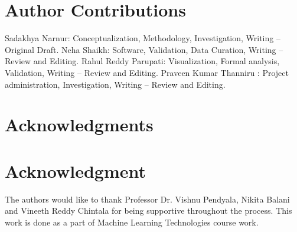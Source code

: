 \documentclass[10pt,journal,compsoc]{IEEEtran}
\begin{document}
\section{Author Contributions}
Sadakhya Narnur: Conceptualization, Methodology, Investigation, Writing – Original Draft.
Neha Shaikh: Software, Validation, Data Curation, Writing – Review and Editing.
Rahul Reddy Parupati: Visualization, Formal analysis, Validation, Writing – Review and Editing.
Praveen Kumar Thanniru : Project administration, Investigation, Writing – Review and Editing.

\ifCLASSOPTIONcompsoc
  \section*{Acknowledgments}
\else
  \section*{Acknowledgment}
\fi


The authors would like to thank Professor Dr. Vishnu Pendyala, Nikita Balani and Vineeth Reddy Chintala for being supportive throughout the process. This work is done as a part of Machine Learning Technologies course work.

\ifCLASSOPTIONcaptionsoff
  \newpage
\fi




\end{document}

